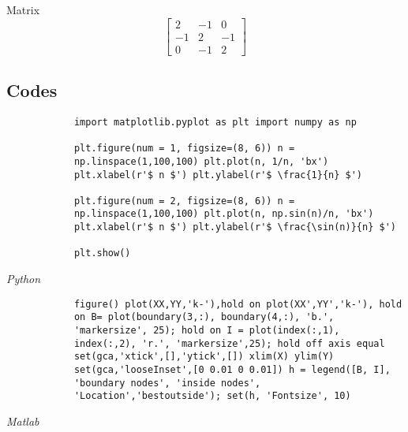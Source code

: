 \documentclass[a4paper, 12pt]{article}
\begin{document}
Matrix
\[
    \begin{bmatrix}
        2 & -1 & 0\\
        -1& 2  &-1\\
        0 & -1 & 2
    \end{bmatrix}
\]

\clearpage
\begin{thebibliography}{99}
\end{thebibliography}

\clearpage

\begin{appendices}
    \section{Codes}
    \begin{listing}[ht]
        \begin{verbatim}
            import matplotlib.pyplot as plt import numpy as np
        
            plt.figure(num = 1, figsize=(8, 6)) n =
            np.linspace(1,100,100) plt.plot(n, 1/n, 'bx')
            plt.xlabel(r'$ n $') plt.ylabel(r'$ \frac{1}{n} $')
        
            plt.figure(num = 2, figsize=(8, 6)) n =
            np.linspace(1,100,100) plt.plot(n, np.sin(n)/n, 'bx')
            plt.xlabel(r'$ n $') plt.ylabel(r'$ \frac{\sin(n)}{n} $')
        
            plt.show()
        \end{verbatim}
        \caption{\em Python}
    \end{listing}

    \begin{listing}[ht]
        \begin{verbatim}
            figure() plot(XX,YY,'k-'),hold on plot(XX',YY','k-'), hold
            on B= plot(boundary(3,:), boundary(4,:), 'b.',
            'markersize', 25); hold on I = plot(index(:,1),
            index(:,2), 'r.', 'markersize',25); hold off axis equal
            set(gca,'xtick',[],'ytick',[]) xlim(X) ylim(Y)
            set(gca,'looseInset',[0 0.01 0 0.01]) h = legend([B, I],
            'boundary nodes', 'inside nodes',
            'Location','bestoutside'); set(h, 'Fontsize', 10)
        \end{verbatim}
        \caption{\em Matlab}
    \end{listing}
\end{appendices}
\end{document}
